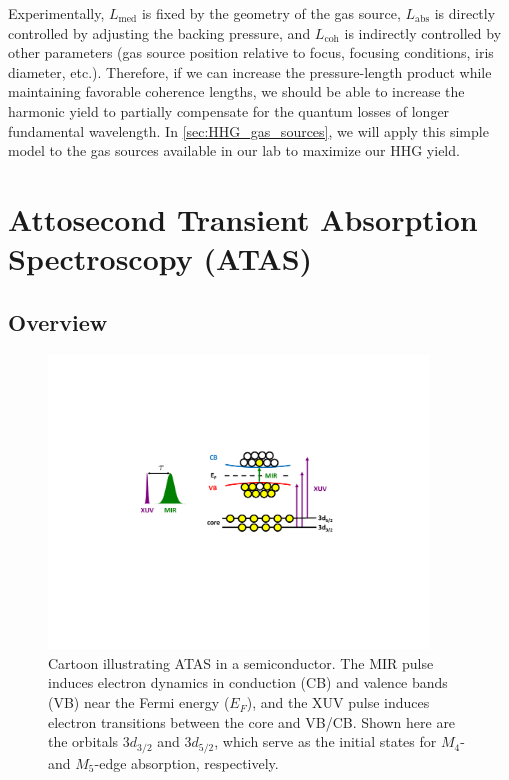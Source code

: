 Experimentally, $L_{\textrm{med}}$ is fixed by the geometry of the gas source, $L_{\textrm{abs}}$ is directly controlled by adjusting the backing pressure, and $L_{\textrm{coh}}$ is indirectly controlled by other parameters (gas source position relative to focus, focusing conditions, iris diameter, etc.). Therefore, if we can increase the pressure-length product while maintaining favorable coherence lengths, we should be able to increase the harmonic yield to partially compensate for the quantum losses of longer fundamental wavelength. In \cref{sec:HHG_gas_sources}, we will apply this simple model to the gas sources available in our lab to maximize our HHG yield.

\section{Attosecond Transient Absorption Spectroscopy (ATAS)}
\label{sec:ATAS}

\subsection{Overview}

\begin{figure}
	\centering
	\includegraphics[width=0.9\textwidth]{figures/chap1/ATAS_cartoon.pdf}
	\caption{Cartoon illustrating ATAS in a semiconductor. The MIR pulse induces electron dynamics in conduction (CB) and valence bands (VB) near the Fermi energy ($E_F$), and the XUV pulse induces electron transitions between the core and VB/CB. Shown here are the orbitals $3d_{3/2}$ and $3d_{5/2}$, which serve as the initial states for $M_4$- and $M_5$-edge absorption, respectively.}
	\label{fig:ATAS_cartoon}
\end{figure}


